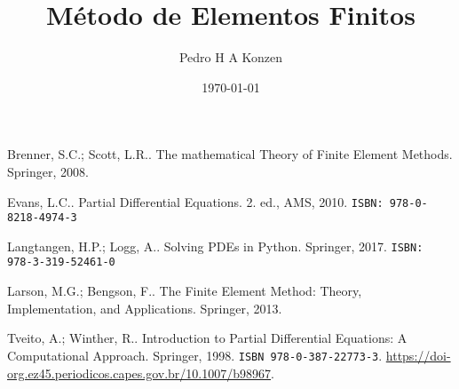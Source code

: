 \documentclass[12pt]{book}
\begin{document}
\frontmatter

\title{Método de Elementos Finitos}
\author{Pedro H A Konzen}
\date{\today}
\ifishtml
\else
{}
\fi

\maketitle




\tableofcontents
{}

\mainmatter




% 

\ifisbook
\clearpage
{}
{}
\fi

\begin{thebibliography}{99}
  Brenner, S.C.; Scott, L.R.. The mathematical Theory of Finite Element Methods. Springer, 2008.

  Evans, L.C.. Partial Differential Equations. 2. ed., AMS, 2010. \texttt{ISBN: 978-0-8218-4974-3}
  
  Langtangen, H.P.; Logg, A.. Solving PDEs in Python. Springer, 2017. \texttt{ISBN: 978-3-319-52461-0}

  Larson, M.G.; Bengson, F.. The Finite Element Method: Theory, Implementation, and Applications. Springer, 2013.

  Tveito, A.; Winther, R.. Introduction to Partial Differential Equations: A Computational Approach. Springer, 1998. \texttt{ISBN 978-0-387-22773-3}. \url{https://doi-org.ez45.periodicos.capes.gov.br/10.1007/b98967}.
\end{thebibliography}
\end{document}
